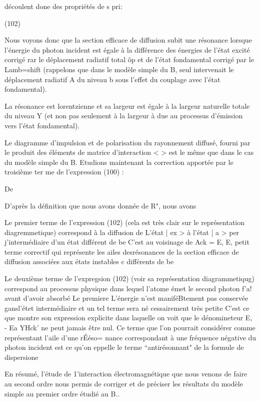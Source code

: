 découlent done des propriétés de s pri:

(102)

Nous voyons donc que la section efficace de diffusion subit
une résonance lorsque l'énergie du photon incident est égale à la différence des énergies de l'état excité corrigé rar le déplacement radiatif total
ôp et de l'état fondamental corrigé par le Lamb=shift (rappelons que dans
le modèle simple du  B, seul intervenait le déplacement radiatif A du
niveau b sous l'effet du couplage avec l'état fondamental).

La résonance est lorentzienne et sa largeur est égale à la largeur naturelle totale du niveau Y (et non pas seulement à la largeur à due
au processus d'émission vers l'état fondamental).

 Le diagramme d'impulsion et de polarisation du rayonnement diffusé, fourni par le produit des éléments de matrice d'interaction
<  > est le même que dans le cas du modèle simple
du  B.
Etudions maintenant la correction apportée par le troisième ter
me de l'expression (100) :

De

D'après la définition que nous avons donnée de R", nous avons

Le premier terme de l'expression (102) (cela est très clair
sur le représentation diagremmetique) correspond à la diffusion de L'état
| ex > à l'état | a > per j'intermédiaire d'un état  différent de be
C'est au voisinage de Ack = E, E, petit terme correctif qui représente
les ailes desrésonances de la section efficace de diffusion associées aux
états instables c différents de be

Le deuxième terme de l'expregsion (102) (voir sa représentation
diagrammetiqug) correspond au processus physique dans lequel l'atome émet
le second photon f'a! avant d'avoir absorbé Le premiere L'énergie n'est maniféBtement pas conservée gansl'étet intermédiaire et un tel terme sera né
cessairement très petite C'est ce que montre son expression explicite dans
laquelle on voit que le dénomineteur E, - Ea YHck' ne peut jamais être nul.
Ce terme que l'on pourrait considérer comme représentant l'aile d'une rÉéso=
nance correspondant à une fréquence négative du photon incident est ce qu'on
eppelle le terme “antirésonnant" de la formule de dispersione

En résumé, l'étude de 1'interaction électromagnétique que nous
venons de faire au second ordre nous  permis de corriger et de préciser les
résultats du modèle simple au premier ordre étudié au  B..

